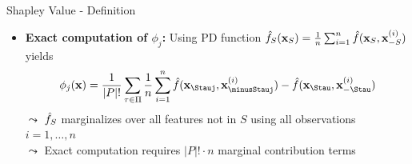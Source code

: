 \documentclass[10pt,compress,t,notes=noshow, xcolor=table]{beamer}
\begin{document}
\begin{frame}{Shapley Value - Definition  }
\begin{itemize}
  $\leadsto$ Marginal contributions and Shapley values can be negative
   \item \textbf{Exact computation of $\phi_j$:} Using PD function 
   $\hat{f}_{S}(\mathbf{x}_S) = \frac{1}{n} \sum_{i=1}^n \hat{f}(\mathbf{x}_S, \mathbf{x}_{-S}^{(i)})$ 
   yields
    $$ \phi_j(\xv) = \frac{1}{|P|!} \sum_{\tau \in \Pi} \frac{1}{n} \sum_{i = 1}^n
   \fh(\xv_{\Stauj}, \xv_{\minusStauj}^{(i)}) - \fh(\xv_{\Stau}, \xv_{- \Stau}^{(i)})
   $$
   $\leadsto$ $\hat{f}_S$ marginalizes over all features not in $S$ using all observations $i = 1, \ldots, n$\\
   $\leadsto$ Exact computation requires $|P|! \cdot n$ marginal contribution terms
   
\end{itemize}
\lz

\end{frame}
\end{document}
